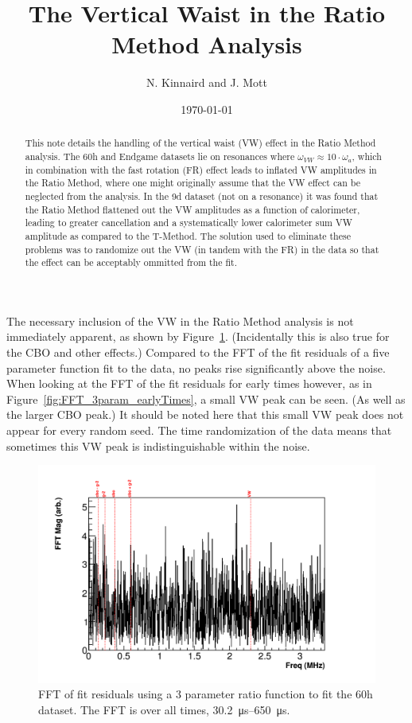 \documentclass[12pt,letterpaper]{article}
\title{The Vertical Waist in the Ratio Method Analysis}
\author{N. Kinnaird and J. Mott}
\date{\today}
\newcommand{\figref}[1]{Figure~\ref{#1}}
\begin{document}
\maketitle

\begin{abstract}
This note details the handling of the vertical waist (VW) effect in the Ratio Method analysis. The 60h and Endgame datasets lie on resonances where $\omega_{VW} \approx 10 \cdot \omega_{a}$, which in combination with the fast rotation (FR) effect leads to inflated VW amplitudes in the Ratio Method, where one might originally assume that the VW effect can be neglected from the analysis. In the 9d dataset (not on a resonance) it was found that the Ratio Method flattened out the VW amplitudes as a function of calorimeter, leading to greater cancellation and a systematically lower calorimeter sum VW amplitude as compared to the T-Method. The solution used to eliminate these problems was to randomize out the VW (in tandem with the FR) in the data so that the effect can be acceptably ommitted from the fit.
\end{abstract}



The necessary inclusion of the VW in the Ratio Method analysis is not immediately apparent, as shown by \figref{fig:FFT_3param_allTimes}. (Incidentally this is also true for the CBO and other effects.) Compared to the FFT of the fit residuals of a five parameter function fit to the data, no peaks rise significantly above the noise. When looking at the FFT of the fit residuals for early times however, as in \figref{fig:FFT_3param_earlyTimes}, a small VW peak can be seen. (As well as the larger CBO peak.) It should be noted here that this small VW peak does not appear for every random seed. The time randomization of the data means that sometimes this VW peak is indistinguishable within the noise. 


\begin{figure}[]
    \centering
    \includegraphics[width=.8\textwidth]{FFT_3param_allTimes}
    \caption[]{FFT of fit residuals using a 3 parameter ratio function to fit the 60h dataset. The FFT is over all times, \SIrange{30.2}{650}{\micro s}.}
    \label{fig:FFT_3param_allTimes}
\end{figure}
\end{document}
